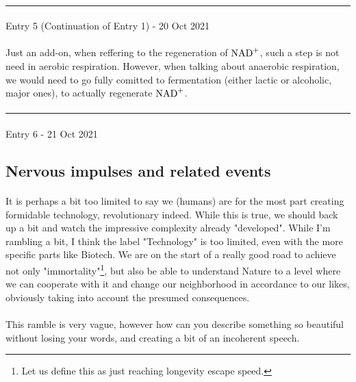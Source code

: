 \documentclass[12pt,  letterpaper]{article}
\begin{document}
\paragraph*{}
\hrule
\paragraph*{}
Entry 5 (Continuation of Entry 1) - 20 Oct 2021
\paragraph*{}
Just an add-on, when reffering to the regeneration of $\ce{NAD+}$, such a step is not need in aerobic respiration. However, when talking about anaerobic respiration, we would need to go fully comitted to fermentation (either lactic or alcoholic, major ones), to actually regenerate $\ce{NAD+}$.
\paragraph*{}
\hrule
\paragraph*{}
Entry 6 - 21 Oct 2021
\subsection*{Nervous impulses and related events}
\paragraph*{}
It is perhaps a bit too limited to say we (humans) are for the most part creating formidable technology, revolutionary indeed. While this is true, we should back up a bit and watch the impressive complexity already "developed". While I'm rambling a bit, I think the label "Technology" is too limited, even with the more specific parts like Biotech. We are on the start of a really good road to achieve not only "immortality"\footnote{Let us define this as just reaching longevity escape speed.}, but also be able to understand Nature to a level where we can cooperate with it and change our neighborhood in accordance to our likes, obviously taking into account the presumed consequences.
\paragraph*{}
This ramble is very vague, however how can you describe something so beautiful without losing your words, and creating a bit of an incoherent speech.
\end{document}
